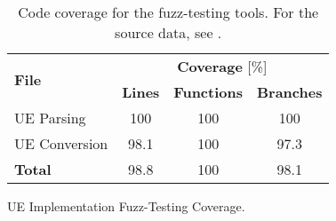 \begin{table}[!htb]
  \centering
  \begin{tabular}{l c c c}
    \toprule
    \multirow{2}{*}[-2pt]{\textbf{File}} & \multicolumn{3}{c}{\textbf{Coverage} [\%]}\\
    \cmidrule{2-4}
    & \textbf{Lines} & \textbf{Functions} & \textbf{Branches}\\
    \midrule
    UE Parsing & 100 & 100 & 100\\
    UE Conversion & 98.1 & 100 & 97.3\\
    \midrule
    \textbf{Total} & 98.8 & 100 & 98.1\\
    \bottomrule
  \end{tabular}
  \caption{UE Implementation Fuzz-Testing Coverage.}
  \label{fig:impl_cov}
  \caption*{Code coverage for the \gls{fuzz-testing} tools. For the source data, see .}
\end{table}
